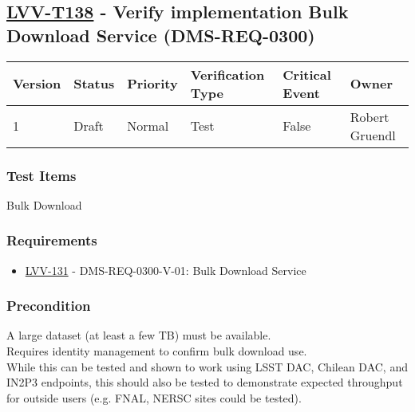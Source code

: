 \hypertarget{lvv-t138---verify-implementation-bulk-download-service-dms-req-0300}{%
\subsection{\texorpdfstring{\href{https://jira.lsstcorp.org/secure/Tests.jspa\#/testCase/LVV-T138}{LVV-T138}
- Verify implementation Bulk Download Service
(DMS-REQ-0300)}{LVV-T138 - Verify implementation Bulk Download Service (DMS-REQ-0300)}}\label{lvv-t138---verify-implementation-bulk-download-service-dms-req-0300}}

\begin{longtable}[]{@{}llllll@{}}
\toprule
Version & Status & Priority & Verification Type & Critical Event &
Owner\tabularnewline
\midrule
\endhead
1 & Draft & Normal & Test & False & Robert Gruendl\tabularnewline
\bottomrule
\end{longtable}

\hypertarget{test-items-114}{%
\subsubsection{Test Items}\label{test-items-114}}

Bulk Download

\hypertarget{requirements-115}{%
\subsubsection{Requirements}\label{requirements-115}}

\begin{itemize}
\tightlist
\item
  \href{https://jira.lsstcorp.org/browse/LVV-131}{LVV-131} -
  DMS-REQ-0300-V-01: Bulk Download Service
\end{itemize}

\hypertarget{precondition-17}{%
\subsubsection{Precondition}\label{precondition-17}}

A large dataset (at least a few TB) must be available.\\
Requires identity management to confirm bulk download use.\\
While this can be tested and shown to work using LSST DAC, Chilean DAC,
and IN2P3 endpoints, this should also be tested to demonstrate expected
throughput for outside users (e.g. FNAL, NERSC sites could be tested).

